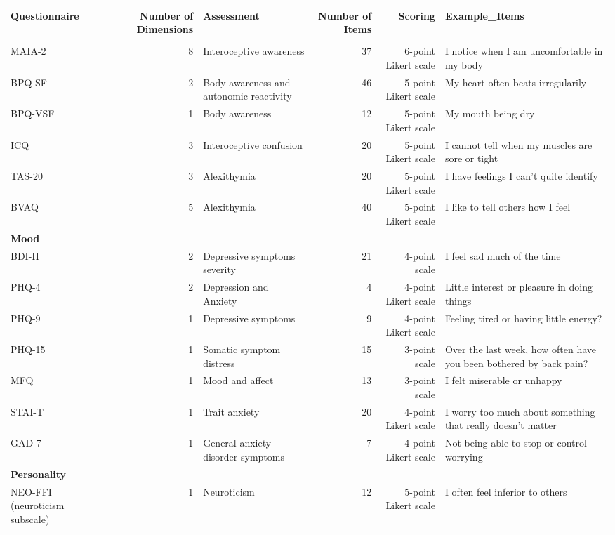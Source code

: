 \begin{table}[t]
\fontsize{6.8pt}{8.1pt}\selectfont
\begin{tabular*}{\linewidth}{@{\extracolsep{\fill}}lrlrrl}
\toprule
Questionnaire & Number of Dimensions & Assessment & Number of Items & Scoring & Example\_Items \\ 
\midrule\addlinespace[2.5pt]
{\bfseries Interoceptive Related} &  &  &  &  &  \\ 
MAIA-2 & 8 & Interoceptive awareness & 37 & 6-point Likert scale & I notice when I am uncomfortable in my body \\ 
BPQ-SF & 2 & Body awareness and autonomic reactivity & 46 & 5-point Likert scale & My heart often beats irregularily \\ 
BPQ-VSF & 1 & Body awareness & 12 & 5-point Likert scale & My mouth being dry \\ 
ICQ & 3 & Interoceptive confusion & 20 & 5-point Likert scale &  I cannot tell when my muscles are sore or tight \\ 
TAS-20 & 3 & Alexithymia & 20 & 5-point Likert scale & I have feelings I can't quite identify \\ 
BVAQ & 5 & Alexithymia & 40 & 5-point Likert scale & I like to tell others how I feel \\ 
{\bfseries Mood} &  &  &  &  &  \\ 
BDI-II & 2 & Depressive symptoms severity & 21 & 4-point scale & I feel sad much of the time \\ 
PHQ-4 & 2 & Depression and Anxiety & 4 & 4-point Likert scale & Little interest or pleasure in doing things \\ 
PHQ-9 & 1 & Depressive symptoms & 9 & 4-point Likert scale & Feeling tired or having little energy? \\ 
PHQ-15 & 1 & Somatic symptom distress & 15 & 3-point scale & Over the last week, how often have you been bothered by back pain? \\ 
MFQ & 1 & Mood and affect & 13 & 3-point scale & I felt miserable or unhappy \\ 
STAI-T & 1 & Trait anxiety & 20 & 4-point Likert scale & I worry too much about something that really doesn't matter \\ 
GAD-7 & 1 & General anxiety disorder symptoms & 7 & 4-point Likert scale & Not being able to stop or control worrying \\ 
{\bfseries Personality} &  &  &  &  &  \\ 
NEO-FFI (neuroticism subscale) & 1 & Neuroticism & 12 & 5-point Likert scale & I often feel inferior to others \\ 

\end{tabular*}
\end{table}
